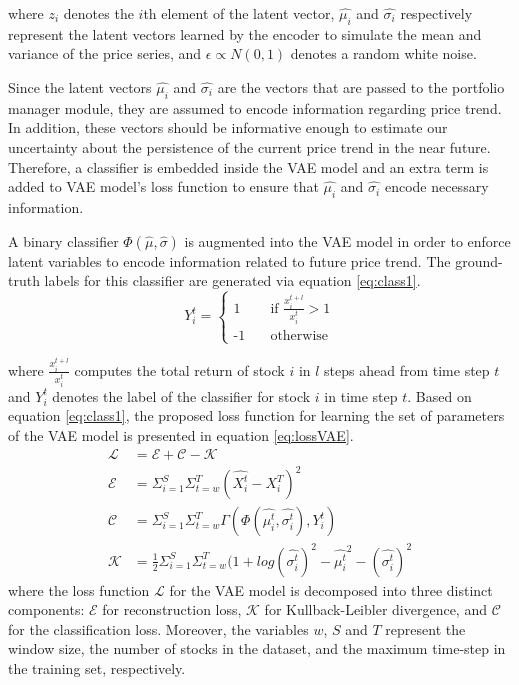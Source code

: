 where $z_i$ denotes the $i$th element of the latent vector, $\hat{\mu_i}$ and $\hat{\sigma_i}$ respectively represent the latent vectors learned by the encoder to simulate the mean and variance of the price series, and $\epsilon \propto N(0, 1)$ denotes a random white noise.

Since the latent vectors $\hat{\mu_i}$ and $\hat{\sigma_i}$ are the vectors that are passed to the portfolio manager module, they are assumed to encode information regarding price trend. In addition, these vectors should be informative enough to estimate our uncertainty about the persistence of the current price trend in the near future. Therefore, a classifier is embedded inside the VAE model and an extra term is added to VAE model's loss function to ensure that $\hat{\mu_i}$ and $\hat{\sigma_i}$ encode necessary information.

A binary classifier $\Phi(\hat{\mu}, \hat{\sigma})$ is augmented into the VAE model in order to enforce latent variables to encode information related to future price trend. The ground-truth labels for this classifier are generated via equation \eqref{eq:class1}.
\begin{equation}
	Y_i^t = 
	\begin{cases}
	\text{1} &\quad\text{if } \frac{x_i^{t+l}}{x_i^t} > 1\\
	\text{-1} &\quad\text{otherwise}
	\end{cases}
	\label{eq:class1}
\end{equation}

where $\frac{x_i^{t+l}}{x_i^t}$ computes the total return of stock $i$ in $l$ steps ahead from time step $t$ and $Y_i^t$ denotes the label of the classifier for stock $i$ in time step $t$. Based on equation \eqref{eq:class1}, the proposed loss function for learning the set of parameters of the VAE model is presented in equation \eqref{eq:lossVAE}.
\begin{align}
	\mathcal{L} &= \mathcal{E}  + \mathcal{C} - \mathcal{K}	\label{eq:lossVAE}  \\
	\mathcal{E} &= \Sigma_{i=1}^S \Sigma_{t=w}^T (\hat{X_i^t} - X_i^T) ^ 2 	\label{eq:lossVAE2} \\
	\mathcal{C} &= \Sigma_{i=1}^S \Sigma_{t=w}^T \Gamma(\Phi(\hat{\mu_i^t}, \hat{\sigma_i^t}), Y_i^t) 	\label{eq:lossVAE3} \\
	\mathcal{K} &= \frac{1}{2} \Sigma_{i=1}^S \Sigma_{t=w}^T (1 + log(\hat{\sigma_i^t})^2 - \hat{\mu_i^t}^2 - (\hat{\sigma_i^t})^2 	\label{eq:lossVAE1} 
\end{align}
where the loss function $\mathcal{L}$ for the VAE model is decomposed into three distinct components: $\mathcal{E}$ for reconstruction loss, $\mathcal{K}$ for Kullback-Leibler divergence, and $\mathcal{C}$ for the classification loss. Moreover, the variables $w$, $S$ and $T$ represent the window size, the number of stocks in the dataset, and the maximum time-step in the training set, respectively.

